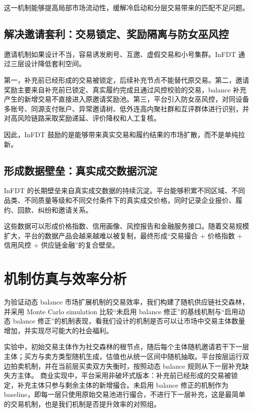 \documentclass[UTF8,11pt]{ctexart}
\begin{document}
这一机制能够提高局部市场流动性，缓解冷启动和分层交易带来的匹配不足问题。

\subsection{解决邀请套利：交易锁定、奖励隔离与防女巫风控}

邀请机制如果设计不当，容易诱发刷号、互邀、虚假交易和小号集群。InFDT 通过三层设计降低套利空间。

第一，补充前已经形成的交易被锁定，后续补充节点不能替代原交易。第二，邀请奖励主要来自补充前已锁定、真实履约完成且通过风控校验的交易，balance 补充产生的新增交易不直接进入原邀请奖励池。第三，平台引入防女巫风控，对同设备多账号、同源支付账户、异常邀请树、低外连高内聚社群和互评群体进行识别，并对高风险链路采取奖励递延、评价降权和人工复核。

因此，InFDT 鼓励的是能够带来真实交易和履约结果的市场扩散，而不是单纯拉新。

\subsection{形成数据壁垒：真实成交数据沉淀}

InFDT 的长期壁垒来自真实成交数据的持续沉淀。平台能够积累不同区域、不同品类、不同质量等级和不同交付条件下的真实成交价格，同时记录企业报价、履约、回款、纠纷和邀请关系。

这些数据可以形成价格指数、信用画像、风控报告和金融服务接口。随着交易规模扩大，平台的数据产品会越来越难以被复制，最终形成“交易撮合 + 价格指数 + 信用风控 + 供应链金融”的复合壁垒。

\section{机制仿真与效率分析}

为验证动态 balance 市场扩展机制的交易效率，我们构建了随机供应链社交森林，并采用 Monte Carlo simulation 比较“未启用 balance 修正”的基线机制与“启用动态 balance 修正”的机制表现，看我们设计的机制是否可以让市场中交易主体数量增加，并实现尽可能大的社会福利。

实验中，初始交易主体作为社交森林的根节点，随后每个主体随机邀请若干下一层主体；买方与卖方类型随机生成，估值也从统一区间中随机抽取。平台按层运行双边拍卖机制，并在当前层买卖双方失衡时，按照动态 balance 规则从下一层补充缺失方主体。
商业实现中，平台采用非破坏式版本：补充前已经形成的交易被锁定，补充主体只参与剩余主体的新增撮合。未启用 balance 修正的机制作为 baseline，即每一层只使用原始交易池进行撮合，不进行下一层补充，这是最简单的交易机制，也是我们机制是否提升效率的对照组。
\end{document}
